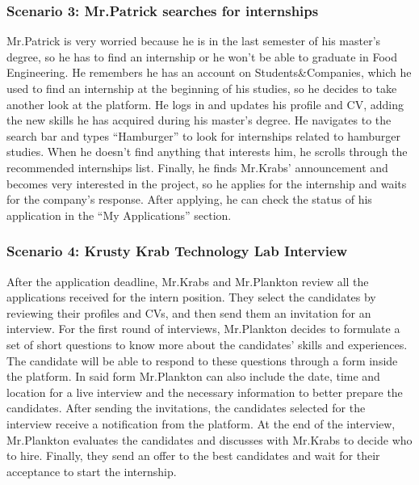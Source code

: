 \subsubsection{Scenario 3: Mr.Patrick searches for internships}\label{subsubsec:scenario_3}
Mr.Patrick is very worried because he is in the last semester of his master's degree, so he has to find an internship or he won't be able to graduate 
in Food Engineering.
He remembers he has an account on Students\&Companies, which he used to find an internship at the beginning of his studies, so he decides 
to take another look at the platform. He logs in and updates his profile and CV, adding the new skills he has acquired during his master’s degree.
He navigates to the search bar and types ``Hamburger'' to look for internships related to hamburger studies. When he doesn’t find anything that 
interests him, he scrolls through the recommended internships list. Finally, he finds Mr.Krabs' announcement and becomes very interested in the 
project, so he applies for the internship and waits for the company's response. After applying, he can check the status of his application in 
the ``My Applications'' section.

\subsubsection{Scenario 4: Krusty Krab Technology Lab Interview}\label{subsubsec:scenario_4}
After the application deadline, Mr.Krabs and Mr.Plankton review all the applications received for the intern position. They select the
candidates by reviewing their profiles and CVs, and then send them an invitation for an interview. For the first round of interviews, Mr.Plankton
decides to formulate a set of short questions to know more about the candidates' skills and experiences. The candidate will be able to respond to 
these questions through a form inside the platform. In said form Mr.Plankton can also include the date, time and location for a live interview and the 
necessary information to better prepare the candidates. After sending the invitations, the candidates selected for the interview receive a notification 
from the platform. At the end of the interview, Mr.Plankton evaluates the candidates and discusses with Mr.Krabs to decide who to hire. Finally, they 
send an offer to the best candidates and wait for their acceptance to start the internship.

